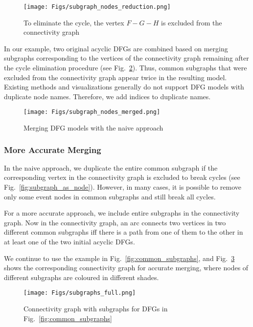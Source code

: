 \documentclass[11pt]{article}
\theoremstyle{definition}
\begin{document}
\begin{figure}[htb]
    \centering
    \texttt{[image: Figs/subgraph\_nodes\_reduction.png]}
    \caption{To eliminate the cycle, the vertex $F-G-H$ is excluded from the connectivity graph}
    \label{fig:subgraph_as_node_reduction}
\end{figure}

In our example,  two original acyclic DFGs are combined based on merging subgraphs corresponding to the vertices of the connectivity graph remaining after the cycle elimination procedure (see Fig.~\ref{fig:subgraph_as_node_merged}). 
Thus, common subgraphs that were excluded from the connectivity graph appear twice in the resulting model.
Existing methods and visualizations generally do not support DFG models with duplicate node names. Therefore, we add indices to duplicate names.


\begin{figure}[htb]
    \centering
    \texttt{[image: Figs/subgraph\_nodes\_merged.png]}
    \caption{Merging DFG models with the naive approach}
    \label{fig:subgraph_as_node_merged}
\end{figure}


\subsubsection{More Accurate 
Merging}\label{sec:accurate}

In the naive approach, we duplicate the entire common subgraph if the corresponding vertex in the connectivity graph is excluded to break cycles (see Fig.~\ref{fig:subgraph_as_node}). 
   However, in many cases, it is possible to remove only some event nodes in common subgraphs and still break all cycles.

For a more accurate approach, we include entire subgraphs in the connectivity graph. 
  Now in the connectivity graph, an arc connects two vertices in two different common subgraphs iff there is a path from one of them to the other in at least one of the two initial acyclic DFGs.
  
We continue to use the example in Fig.~\ref{fig:common_subgraphs}, and  Fig.~\ref{fig:subgraph_full} shows the corresponding connectivity graph for accurate merging, where nodes of different subgraphs are coloured in different shades.

\begin{figure}[htb]
    \centering
    \texttt{[image: Figs/subgraphs\_full.png]}
    \caption{Connectivity graph with subgraphs for DFGs in Fig.~\ref{fig:common_subgraphs}}
    \label{fig:subgraph_full}
\end{figure}
\end{document}
